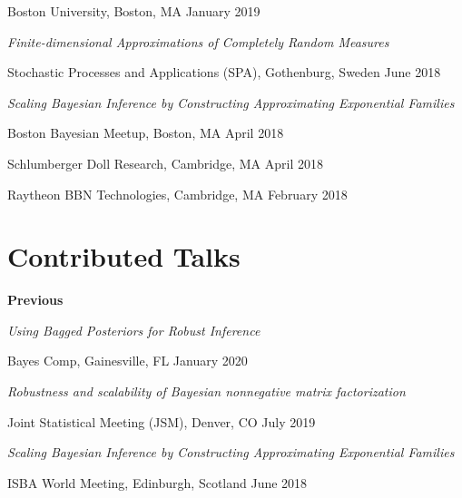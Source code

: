 \documentclass[margin,line]{res}
\newenvironment{talkgroup}{\setlength{\parskip}{3pt}\everypar{\hangafter=1\hangindent=1em\relax}\par}{\par\everypar{\hangafter=0\relax}}
\begin{document}
\begin{resume}
\begin{talkgroup}
Boston University, Boston, MA \hfill January 2019

\end{talkgroup}

\emph{Finite-dimensional Approximations of Completely Random Measures}

\begin{talkgroup}
Stochastic Processes and Applications (SPA), Gothenburg, Sweden \hfill June 2018

\end{talkgroup}


\emph{Scaling Bayesian Inference by Constructing Approximating Exponential Families}

\begin{talkgroup}
Boston Bayesian Meetup, Boston, MA \hfill April 2018

Schlumberger Doll Research, Cambridge, MA \hfill April 2018

Raytheon BBN Technologies, Cambridge, MA \hfill February 2018

\end{talkgroup}



\section{\sc Contributed Talks}

%
%
%



\textbf{Previous}

\emph{Using Bagged Posteriors for Robust Inference}
\begin{talkgroup}
Bayes Comp, Gainesville, FL \hfill January 2020
\end{talkgroup}

\emph{Robustness and scalability of Bayesian nonnegative matrix factorization}
\begin{talkgroup}
Joint Statistical Meeting (JSM), Denver, CO \hfill July 2019
\end{talkgroup}

\emph{Scaling Bayesian Inference by Constructing Approximating Exponential Families}
\begin{talkgroup}
ISBA World Meeting, Edinburgh, Scotland \hfill June 2018
\end{talkgroup}


\end{resume}
\end{document}
